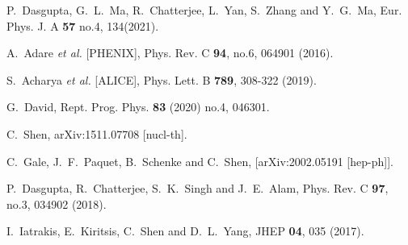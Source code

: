 \documentclass[aps,prc,twocolumn,floatfix,12pts,superscriptaddress]{revtex4}
\begin{document}
{{\begin{thebibliography}{99}
P.~Dasgupta, G.~L.~Ma, R.~Chatterjee, L.~Yan, S.~Zhang and Y.~G.~Ma,
Eur. Phys. J. A \textbf{57}  no.4, 134(2021).

A.~Adare \textit{et al.} [PHENIX],
Phys. Rev. C \textbf{94}, no.6, 064901 (2016).

S.~Acharya \textit{et al.} [ALICE],
Phys. Lett. B \textbf{789}, 308-322 (2019).

G.~David,
Rept. Prog. Phys. \textbf{83} (2020) no.4, 046301.


C.~Shen,
arXiv:1511.07708 [nucl-th].

C.~Gale, J.~F.~Paquet, B.~Schenke and C.~Shen,
[arXiv:2002.05191 [hep-ph]].

P.~Dasgupta, R.~Chatterjee, S.~K.~Singh and J.~E.~Alam,
Phys. Rev. C \textbf{97}, no.3, 034902 (2018).

I.~Iatrakis, E.~Kiritsis, C.~Shen and D.~L.~Yang,
JHEP \textbf{04}, 035 (2017).


\end{thebibliography}}}
\end{document}
